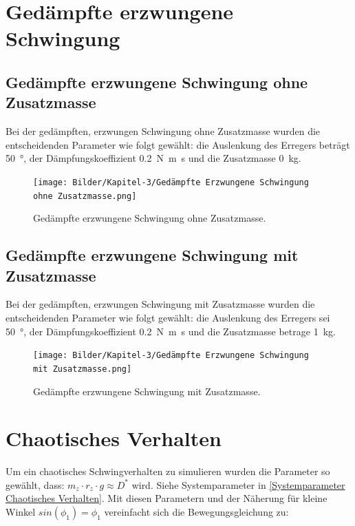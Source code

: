     \section{Gedämpfte erzwungene Schwingung}

        \subsection{Gedämpfte erzwungene Schwingung ohne Zusatzmasse}

            Bei der gedämpften, erzwungen Schwingung ohne Zusatzmasse wurden die entscheidenden Parameter wie folgt gewählt: die Auslenkung des Erregers beträgt \qty{50}{\degree}, der Dämpfungskoeffizient \qty{0,2}{\newton\metre\second} und die Zusatzmasse \qty{0}{\kilo\gram}.
            \begin{figure}[htbp]
                \centering
                    \texttt{[image: Bilder/Kapitel-3/Gedämpfte Erzwungene Schwingung ohne Zusatzmasse.png]}
                \caption[Gedämpfte erzwungene Schwingung ohne Zusatzmasse]{Gedämpfte erzwungene Schwingung ohne Zusatzmasse.}\label{Gedämpfte Erzwungene Schwingung ohne Zusatzmasse}
                \end{figure}

        \subsection{Gedämpfte erzwungene Schwingung mit Zusatzmasse}

            Bei der gedämpften, erzwungen Schwingung mit Zusatzmasse wurden die entscheidenden Parameter wie folgt gewählt: die Auslenkung des Erregers sei \qty{50}{\degree}, der Dämpfungskoeffizient \qty{0,2}{\newton\metre\second} und die Zusatzmasse betrage \qty{1}{\kilo\gram}.

            \begin{figure}[htbp]
                \centering
                \texttt{[image: Bilder/Kapitel-3/Gedämpfte Erzwungene Schwingung mit Zusatzmasse.png]}
                \caption[Gedämpfte erzwungene Schwingung mit Zusatzmasse]{Gedämpfte erzwungene Schwingung mit Zusatzmasse.}\label{Gedämpfte Erzwungene Schwingung mit Zusatzmasse}
            \end{figure}

    \section{Chaotisches Verhalten}
        Um ein chaotisches Schwingverhalten zu simulieren wurden die Parameter so gewählt, dass: \(m_z \cdot r_z \cdot g \approx D^\ast\) wird.
        Siehe Systemparameter in \cref{Systemparameter Chaotisches Verhalten}.
        Mit diesen Parametern und der Näherung für kleine Winkel \(sin(\phi_1)=\phi_1\) vereinfacht sich die Bewegungsgleichung zu:
        
